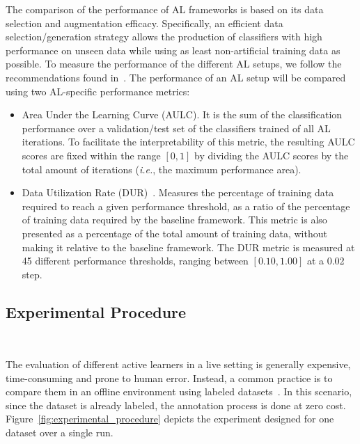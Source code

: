 \documentclass[parskip=full]{scrartcl}
\begin{document}
The comparison of the performance of AL frameworks is based on its data
selection and augmentation efficacy. Specifically, an efficient data
selection/generation strategy allows the production of classifiers with high
performance on unseen data while using as least non-artificial training data
as possible. To measure the performance of the different AL setups, we follow
the recommendations found in~\cite{Kottke2017}. The performance of an AL setup
will be compared using two AL-specific performance metrics:

\begin{itemize}

    \item Area Under the Learning Curve (AULC). It is the sum of the
        classification performance over a validation/test set of the
        classifiers trained of all AL iterations. To facilitate the
        interpretability of this metric, the resulting AULC scores are fixed
        within the range $[0, 1]$ by dividing the AULC scores by the total
        amount of iterations (\textit{i.e.}, the maximum performance area).

    \item Data Utilization Rate (DUR)~\cite{Reitmaier2013}. Measures the
        percentage of training data required to reach a given performance
        threshold, as a ratio of the percentage of training data required by
        the baseline framework. This metric is also presented as a percentage
        of the total amount of training data, without making it relative to
        the baseline framework. The DUR metric is measured at 45 different
        performance thresholds, ranging between $[0.10, 1.00]$ at a 0.02 step.

\end{itemize}

\subsection{Experimental Procedure}~\label{sec:experimental_procedure}

The evaluation of different active learners in a live setting is generally
expensive, time-consuming and prone to human error. Instead, a common practice
is to compare them in an offline environment using labeled
datasets~\cite{Kagy2019}. In this scenario, since the dataset is already
labeled, the annotation process is done at zero cost.
Figure~\ref{fig:experimental_procedure} depicts the experiment designed for
one dataset over a single run. 
\end{document}

